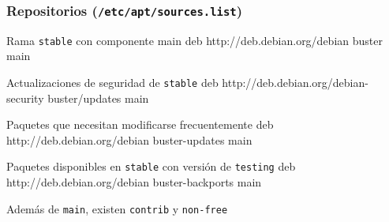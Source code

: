 \documentclass{beamer}
\begin{document}
\begin{frame}
  \frametitle{Repositorios (\texttt{/etc/apt/sources.list})}
  \begin{block}{Rama \texttt{stable} con componente main}
    deb http://deb.debian.org/debian buster main
  \end{block}
  \begin{block}{Actualizaciones de seguridad de \texttt{stable}}
    deb http://deb.debian.org/debian-security buster/updates main
  \end{block}
  \begin{block}{Paquetes que necesitan modificarse frecuentemente}
    deb http://deb.debian.org/debian buster-updates main  
  \end{block}
  \begin{block}{Paquetes disponibles en \texttt{stable} con versión de
      \texttt{testing}}
    deb http://deb.debian.org/debian buster-backports main  
  \end{block}
  Además de \texttt{main}, existen \texttt{contrib} y \texttt{non-free}
\end{frame}
\end{document}
